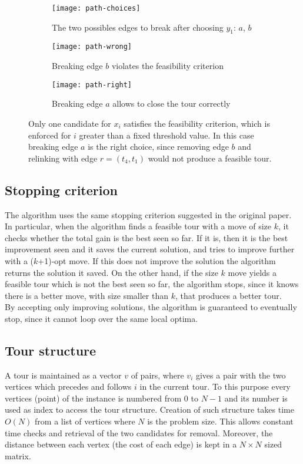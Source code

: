 \begin{figure}[h]
	\centering
	\begin{subfigure}[c]{0.31\textwidth}
		\texttt{[image: path-choices]}
		\caption{The two possibles edges to break after choosing $y_1$: $a$, $b$}
	\end{subfigure}
	\begin{subfigure}[c]{0.31\textwidth}
		\texttt{[image: path-wrong]}
		\caption{Breaking edge $b$ violates the feasibility criterion}
	\end{subfigure}
	\begin{subfigure}[c]{0.31\textwidth}
		\texttt{[image: path-right]}
		\caption{Breaking edge $a$ allows to close the tour correctly}
	\end{subfigure}
	\caption[Candidate edges satisfying and violating the feasibility criterion]{Only one candidate for $x_i$ satisfies the feasibility criterion, which is enforced for $i$ greater than a fixed threshold value. In this case breaking edge $a$ is the right choice, since removing edge $b$ and relinking with edge $r=(t_4,t_1)$ would not produce a feasible tour.}
	\label{fig:feasibility-moves}
\end{figure}

\subsection{Stopping criterion}
The algorithm uses the same stopping criterion suggested in the original paper. In particular, when the algorithm finds a feasible tour with a move of size $k$, it checks whether the total gain is the best seen so far. If it is, then it is the best improvement seen and it saves the current solution, and tries to improve further with a ($k$+1)-opt move. If this does not improve the solution the algorithm returns the solution it saved. On the other hand, if the size $k$ move yields a feasible tour which is not the best seen so far, the algorithm stops, since it knows there is a better move, with size smaller than $k$, that produces a better tour.\\
By accepting only improving solutions, the algorithm is guaranteed to eventually stop, since it cannot loop over the same local optima.

\subsection{Tour structure}
A tour is maintained as a vector $v$ of pairs, where $v_i$ gives a pair with the two vertices which precedes and follows $i$ in the current tour. To this purpose every vertices (point) of the instance is numbered from $0$ to $N-1$ and its number is used as index to access the tour structure. Creation of such structure takes time $O(N)$ from a list of vertices where $N$ is the problem size. This allows constant time checks and retrieval of the two candidates for removal. Moreover, the distance between each vertex (the cost of each edge) is kept in a $N\times N$ sized matrix.

